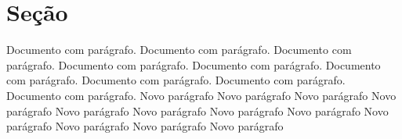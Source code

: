 \documentclass{article}
\begin{document}
	
	\section{Seção}
	Documento com parágrafo. Documento com parágrafo. Documento com parágrafo. Documento com parágrafo. Documento com parágrafo. Documento com parágrafo. Documento com parágrafo. Documento com parágrafo. Documento com parágrafo.
		Novo parágrafo Novo parágrafo Novo parágrafo Novo parágrafo Novo parágrafo Novo parágrafo Novo parágrafo Novo parágrafo Novo parágrafo Novo parágrafo Novo parágrafo Novo parágrafo

	
	
\end{document}
